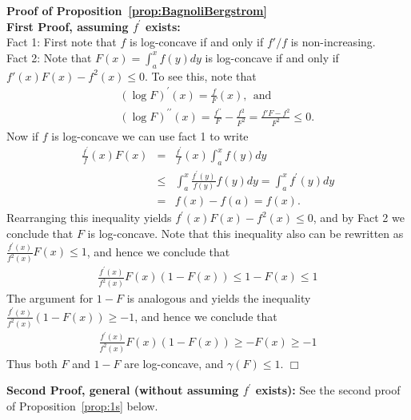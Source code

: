 \documentclass[11pt]{amsart}
\numberwithin{equation}{section}
\theoremstyle{definition}\newtheorem{definition}{Definition}
\theoremstyle{remark}\newtheorem{assumption}{Assumption}
\theoremstyle{remark}\newtheorem{remark}{Remark}
\theoremstyle{definition}\newtheorem{example}{Example}
\theoremstyle{plain}\newtheorem{question}{Question}
\theoremstyle{plain}\newtheorem{theorem}{Theorem}
\theoremstyle{plain}\newtheorem{lemma}{Lemma}
\theoremstyle{plain}\newtheorem{proposition}{Proposition}
\theoremstyle{plain}\newtheorem{corollary}{Corollary}
\theoremstyle{plain}\newtheorem{conjecture}{Conjecture}
\begin{document}
\par\noindent
{\bf Proof of Proposition~\ref{prop:BagnoliBergstrom}} \\
{\bf First Proof, assuming $f^{\prime}$ exists:}\\
Fact 1:  First note that $f$ is log-concave if and only if $f'/f$ is non-increasing. \\
Fact 2:  Note that $F(x) = \int_a^x f(y) dy$ is log-concave if and only if 
$f'(x) F(x) - f^2(x) \le 0$.  To see this, note that 
\begin{eqnarray*}
&& (\log F)^{\prime} (x) = \frac{f}{F} (x), \ \ \mbox{and}\\
&& (\log F)^{\prime \prime} (x) = \frac{f^{\prime \prime}}{F} - \frac{f^2}{F^2} = \frac{f' F - f^2}{F^2} \le 0 .
\end{eqnarray*}
Now if $f$ is log-concave we can use fact 1 to write
\begin{eqnarray*}
\frac{f^{\prime}}{f} (x) F(x) 
& = & \frac{f^{\prime}}{f} (x)\int_a^x f(y) dy \\
& \le & \int_a^x \frac{f^{\prime} (y)}{f(y)} f(y) dy = \int_a^x f^{\prime} (y) dy \\
& = & f(x) - f(a) = f(x) .
\end{eqnarray*}
Rearranging this inequality yields 
$f^{\prime} (x) F(x) - f^2(x) \le 0$, and by Fact 2 we conclude that $F$ is log-concave.
Note that this inequality also can be rewritten as 
$\frac{f^{\prime} (x)}{f^2 (x)} F(x) \le 1$,
and hence we conclude that 
\begin{eqnarray*}
\frac{f^{\prime} (x)}{f^2 (x)} F(x)(1-F(x)) \le 1-F(x) \le 1
\end{eqnarray*}
The argument for $1-F$ is analogous and yields the inequality 
$\frac{f^{\prime} (x)}{f^2 (x)} (1-F(x)) \ge -1$,
and hence we conclude that 
\begin{eqnarray*}
\frac{f^{\prime} (x)}{f^2 (x)} F(x)(1-F(x)) \ge -F(x) \ge -1
\end{eqnarray*}
Thus both $F$ and $1-F$ are log-concave, and $\gamma (F) \le 1$.
\hfill $\Box$
\medskip


\par\noindent
{\bf Second Proof, general (without assuming $f^{\prime}$ exists):}   See the second proof of Proposition~\ref{prop:1s} below.
\medskip
\end{document}
